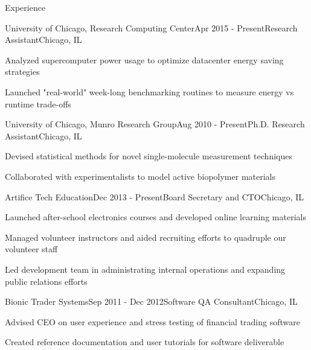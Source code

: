 \documentclass{resume} %
\begin{document}
\begin{rSection}{Experience}

\begin{rSubsection}{University of Chicago, Research Computing Center}{Apr 2015 - Present}{Research Assistant}{Chicago, IL}
\item Analyzed supercomputer power usage to optimize datacenter energy saving strategies
\item Launched "real-world" week-long benchmarking routines to measure energy vs runtime trade-offs

\end{rSubsection}


\begin{rSubsection}{University of Chicago, Munro Research Group}{Aug 2010 - Present}{Ph.D. Research Assistant}{Chicago, IL}
\item Devised statistical methods for novel single-molecule measurement techniques
\item Collaborated with experimentalists to model active biopolymer materials

\end{rSubsection}


\begin{rSubsection}{Artifice Tech Education}{Dec 2013 - Present}{Board Secretary and CTO}{Chicago, IL}
\item Launched after-school electronics courses and developed online learning materials
\item Managed volunteer instructors and aided recruiting efforts to quadruple our volunteer staff
\item Led development team in administrating internal operations and expanding public relations efforts

\end{rSubsection}


\begin{rSubsection}{Bionic Trader Systems}{Sep 2011 - Dec 2012}{Software QA Consultant}{Chicago, IL}
\item Advised CEO on user experience and stress testing of financial trading software
\item Created reference documentation and user tutorials for software deliverable


\end{rSubsection}
\end{rSection}
\end{document}
